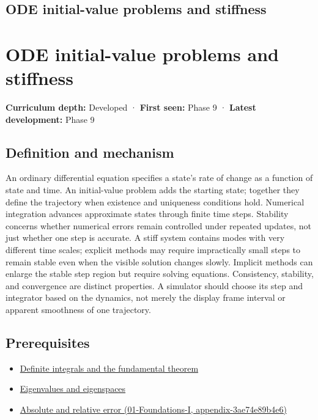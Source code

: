 \hypertarget{appendix-e8ab9836882e}{}
\section*{ODE initial-value problems and stiffness}
\chapter{ODE initial-value problems and stiffness}\label{appendix-e8ab9836882e-ode-initial-value-problems-and-stiffness}

\textbf{Curriculum depth:} Developed · \textbf{First seen:} Phase 9 · \textbf{Latest development:} Phase 9

\section{Definition and mechanism}\label{appendix-e8ab9836882e-definition-and-mechanism}

An ordinary differential equation specifies a state's rate of change as a function of state and time. An initial-value problem adds the starting state; together they define the trajectory when existence and uniqueness conditions hold. Numerical integration advances approximate states through finite time steps. Stability concerns whether numerical errors remain controlled under repeated updates, not just whether one step is accurate. A stiff system contains modes with very different time scales; explicit methods may require impractically small steps to remain stable even when the visible solution changes slowly. Implicit methods can enlarge the stable step region but require solving equations. Consistency, stability, and convergence are distinct properties. A simulator should choose its step and integrator based on the dynamics, not merely the display frame interval or apparent smoothness of one trajectory.

\section{Prerequisites}\label{appendix-e8ab9836882e-prerequisites}

\begin{itemize}
\tightlist
\item
  \hyperref[appendix-1a50e72435c2]{Definite integrals and the fundamental theorem}
\item
  \hyperref[appendix-0b3be18411f9]{Eigenvalues and eigenspaces}
\item
  \href{../01-Foundations-I/main.pdf\#nameddest=appendix-3ae74e89b4e6}{Absolute and relative error (01-Foundations-I, appendix-3ae74e89b4e6)}
\end{itemize}

